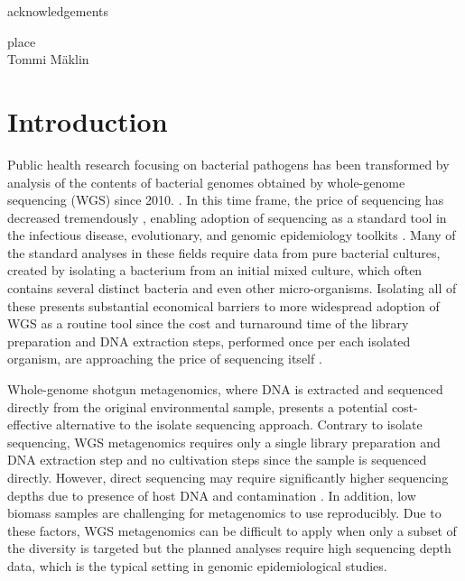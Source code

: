 \documentclass[officiallayout]{tktla}
\begin{document}
\begin{acknowledgements}
  acknowledgements
   \begin{flushright}
  place\\
  Tommi M\"aklin
  \end{flushright}
\end{acknowledgements}

\tableofcontents

\mainmatter

\chapter{Introduction}
\sloppy

Public health research focusing on bacterial pathogens has been
transformed by analysis of the contents of bacterial genomes obtained
by whole-genome sequencing (WGS) since 2010.
\citep{armstrong2019pathogen}. In this time frame, the price of
sequencing has decreased tremendously \citep{dnaseqcost,
  goodwin2016coming}, enabling adoption of sequencing as a standard
tool in the infectious disease, evolutionary, and genomic epidemiology
toolkits \citep{tang2017infection, grad2014epidemiologic,
  kwong2015whole}. Many of the standard analyses in these fields
require data from pure bacterial cultures, created by isolating a
bacterium from an initial mixed culture, which often contains several
distinct bacteria and even other micro-organisms. Isolating all of
these presents substantial economical barriers to more widespread
adoption of WGS as a routine tool since the cost and turnaround time
of the library preparation and DNA extraction steps, performed once
per each isolated organism, are approaching the price of sequencing
itself \citep{rossen2018practical}.

Whole-genome shotgun metagenomics, where DNA is extracted and
sequenced directly from the original environmental sample, presents a
potential cost-effective alternative to the isolate sequencing
approach. Contrary to isolate sequencing, WGS metagenomics requires
only a single library preparation and DNA extraction step and no
cultivation steps since the sample is sequenced directly. However,
direct sequencing may require significantly higher sequencing depths
due to presence of host DNA \citep{pereira2019impact,
  mcardle2020sensitivity} and contamination
\citep{mcardle2020sensitivity, salter2014reagent}. In addition, low
biomass samples are challenging for metagenomics to use
reproducibly. Due to these factors, WGS metagenomics can be difficult
to apply when only a subset of the diversity is targeted but the
planned analyses require high sequencing depth data, which is the
typical setting in genomic epidemiological studies.
\end{document}
